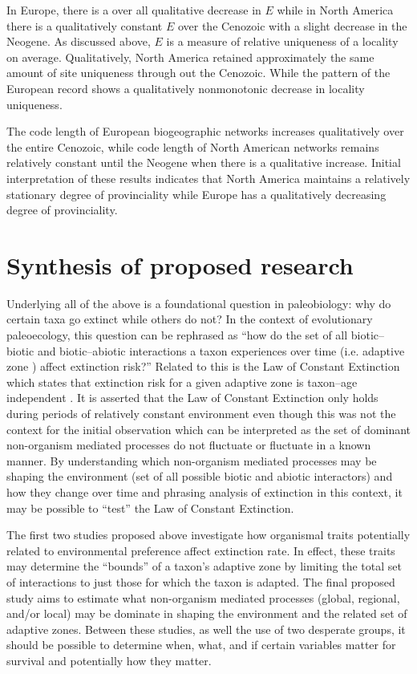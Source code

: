 \documentclass[12pt,letterpaper]{article}
\begin{document}
In Europe, there is a over all qualitative decrease in \(E\) while in North America there is a qualitatively constant \(E\) over the Cenozoic with a slight decrease in the Neogene. As discussed above, \(E\) is a measure of relative uniqueness of a locality on average. Qualitatively, North America retained approximately the same amount of site uniqueness through out the Cenozoic. While the pattern of the European record shows a qualitatively nonmonotonic decrease in locality uniqueness.

The code length of European biogeographic networks increases qualitatively over the entire Cenozoic, while code length of North American networks remains relatively constant until the Neogene when there is a qualitative increase. Initial interpretation of these results indicates that North America maintains a relatively stationary degree of provinciality while Europe has a qualitatively decreasing degree of provinciality. 


\section{Synthesis of proposed research}
Underlying all of the above is a foundational question in paleobiology: why do certain taxa go extinct while others do not? In the context of evolutionary paleoecology, this question can be rephrased as ``how do the set of all biotic--biotic and biotic--abiotic interactions a taxon experiences over time (i.e. adaptive zone \citealp{Simpson1944}) affect extinction risk?'' Related to this is the Law of Constant Extinction which states that extinction risk for a given adaptive zone is taxon--age independent \citep{VanValen1973}. It is asserted that the Law of Constant Extinction only holds during periods of relatively constant environment even though this was not the context for the initial observation \citep{Liow2007b,VanValen1973} which can be interpreted as the set of dominant non-organism mediated processes do not fluctuate or fluctuate in a known manner. By understanding which non-organism mediated processes may be shaping the environment (set of all possible biotic and abiotic interactors) and how they change over time and phrasing analysis of extinction in this context, it may be possible to ``test'' the Law of Constant Extinction.

The first two studies proposed above investigate how organismal traits potentially related to environmental preference affect extinction rate. In effect, these traits may determine the ``bounds'' of a taxon's adaptive zone by limiting the total set of interactions to just those for which the taxon is adapted. The final proposed study aims to estimate what non-organism mediated processes (global, regional, and/or local) may be dominate in shaping the environment and the related set of adaptive zones. Between these studies, as well the use of two desperate groups, it should be possible to determine when, what, and if certain variables matter for survival and potentially how they matter. 
\end{document}

